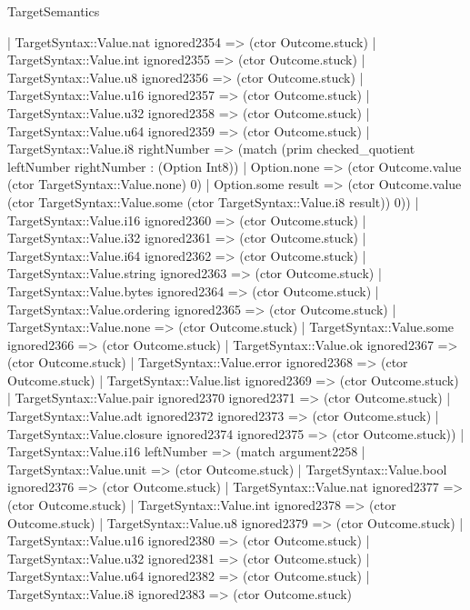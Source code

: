 \begin{lexlean}{TargetSemantics}
\begin{semanticmodule}
{              | TargetSyntax::Value.nat ignored2354 => (ctor Outcome.stuck)
              | TargetSyntax::Value.int ignored2355 => (ctor Outcome.stuck)
              | TargetSyntax::Value.u8 ignored2356 => (ctor Outcome.stuck)
              | TargetSyntax::Value.u16 ignored2357 => (ctor Outcome.stuck)
              | TargetSyntax::Value.u32 ignored2358 => (ctor Outcome.stuck)
              | TargetSyntax::Value.u64 ignored2359 => (ctor Outcome.stuck)
              | TargetSyntax::Value.i8 rightNumber => (match (prim checked_quotient leftNumber rightNumber : (Option Int8))
                | Option.none => (ctor Outcome.value (ctor TargetSyntax::Value.none) 0)
                | Option.some result => (ctor Outcome.value (ctor TargetSyntax::Value.some (ctor TargetSyntax::Value.i8 result)) 0))
              | TargetSyntax::Value.i16 ignored2360 => (ctor Outcome.stuck)
              | TargetSyntax::Value.i32 ignored2361 => (ctor Outcome.stuck)
              | TargetSyntax::Value.i64 ignored2362 => (ctor Outcome.stuck)
              | TargetSyntax::Value.string ignored2363 => (ctor Outcome.stuck)
              | TargetSyntax::Value.bytes ignored2364 => (ctor Outcome.stuck)
              | TargetSyntax::Value.ordering ignored2365 => (ctor Outcome.stuck)
              | TargetSyntax::Value.none => (ctor Outcome.stuck)
              | TargetSyntax::Value.some ignored2366 => (ctor Outcome.stuck)
              | TargetSyntax::Value.ok ignored2367 => (ctor Outcome.stuck)
              | TargetSyntax::Value.error ignored2368 => (ctor Outcome.stuck)
              | TargetSyntax::Value.list ignored2369 => (ctor Outcome.stuck)
              | TargetSyntax::Value.pair ignored2370 ignored2371 => (ctor Outcome.stuck)
              | TargetSyntax::Value.adt ignored2372 ignored2373 => (ctor Outcome.stuck)
              | TargetSyntax::Value.closure ignored2374 ignored2375 => (ctor Outcome.stuck))
            | TargetSyntax::Value.i16 leftNumber => (match argument2258
              | TargetSyntax::Value.unit => (ctor Outcome.stuck)
              | TargetSyntax::Value.bool ignored2376 => (ctor Outcome.stuck)
              | TargetSyntax::Value.nat ignored2377 => (ctor Outcome.stuck)
              | TargetSyntax::Value.int ignored2378 => (ctor Outcome.stuck)
              | TargetSyntax::Value.u8 ignored2379 => (ctor Outcome.stuck)
              | TargetSyntax::Value.u16 ignored2380 => (ctor Outcome.stuck)
              | TargetSyntax::Value.u32 ignored2381 => (ctor Outcome.stuck)
              | TargetSyntax::Value.u64 ignored2382 => (ctor Outcome.stuck)
              | TargetSyntax::Value.i8 ignored2383 => (ctor Outcome.stuck)
}
\end{semanticmodule}
\end{lexlean}
